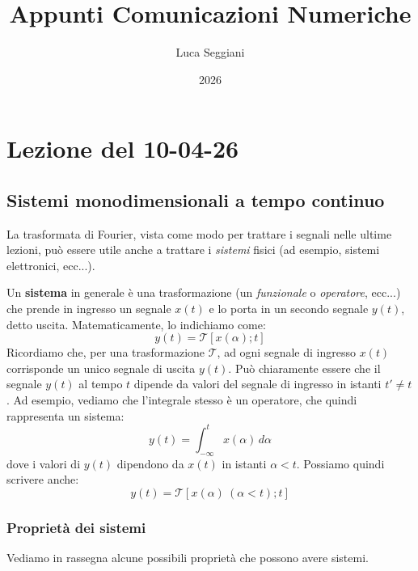 \documentclass[a4paper,11pt]{article}
\title{Appunti Comunicazioni Numeriche}
\author{Luca Seggiani}
\date{2026}
\begin{document}
\section{Lezione del 10-04-26}

\thispagestyle{empty}
\pagestyle{fancy}

\subsection{Sistemi monodimensionali a tempo continuo}
La trasformata di Fourier, vista come modo per trattare i segnali nelle ultime lezioni, può essere utile anche a trattare i \textit{sistemi} fisici (ad esempio, sistemi elettronici, ecc...). 

Un \textbf{sistema} in generale è una trasformazione (un \textit{funzionale} o \textit{operatore}, ecc...) che prende in ingresso un segnale $x(t)$ e lo porta in un secondo segnale $y(t)$, detto uscita. Matematicamente, lo indichiamo come:
$$
y(t) = \mathcal{T} \left[ x(\alpha); t \right]
$$
Ricordiamo che, per una trasformazione $\mathcal{T}$, ad ogni segnale di ingresso $x(t)$ corrisponde un unico segnale di uscita $y(t)$. Può chiaramente essere che il segnale $y(t)$ al tempo $t$ dipende da valori del segnale di ingresso in istanti $t' \neq t$.
Ad esempio, vediamo che l'integrale stesso è un operatore, che quindi rappresenta un sistema:
$$
y(t) = \int_{-\infty}^t x(\alpha) \, d\alpha
$$
dove i valori di $y(t)$ dipendono da $x(t)$ in istanti $\alpha < t$. Possiamo quindi scrivere anche:
$$
y(t) = \mathcal{T} \left[ x(\alpha) \ (\alpha < t); t \right]
$$

\subsubsection{Proprietà dei sistemi}
Vediamo in rassegna alcune possibili proprietà che possono avere sistemi.
\end{document}
